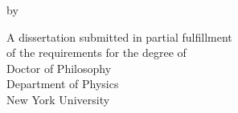 \thispagestyle{empty}
\begin{center}
        
        {\large\textbf{\thesistitle}}
        
        \vspace{0.7in}
        by
        
        \vspace{0.7in}
        
        \text{\thesisauthor}
        
        \vspace{0.7in}
        
        \begin{doublespace}
           A dissertation submitted in partial fulfillment\\
           of the requirements for the degree of\\
           Doctor of Philosophy\\
           Department of Physics\\
           New York University\\
           \graddate
        \end{doublespace}
\end{center}
\vspace{.7in}
\noindent\makebox[\textwidth]{\hfill\makebox[2.5in]{\hrulefill}}\\
\makebox[\textwidth]{\hfill\makebox[2.5in]{\hfill\thesisadvisor\hfill}}
